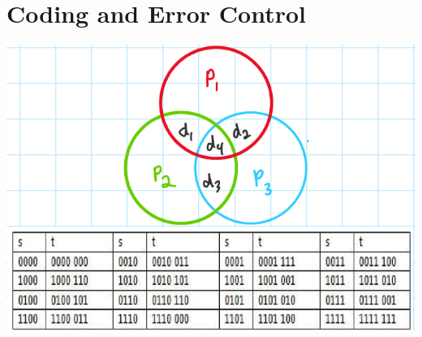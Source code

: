 \documentclass[11pt]{article}
\begin{document}
\section{Coding and Error Control}
\begin{center}
    \includegraphics[width=1\textwidth]{3x}
\end{center}
\end{document}
